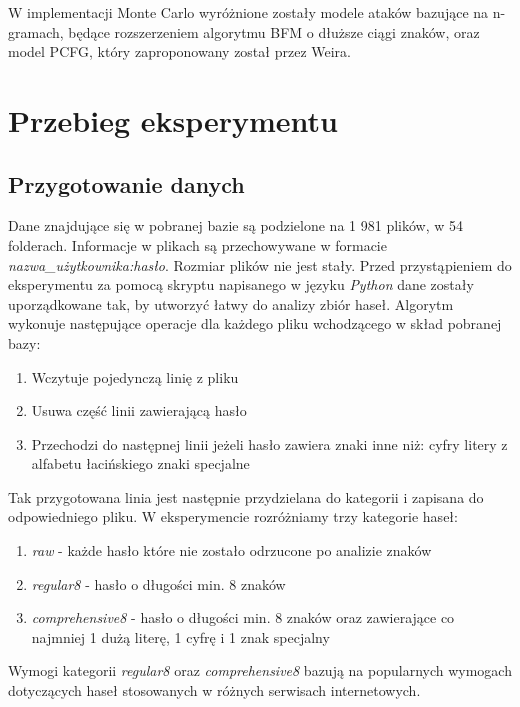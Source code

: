 \documentclass{article}
\begin{document}
	W implementacji Monte Carlo \cite{montecarloimplementation} wyróżnione zostały modele ataków bazujące na n-gramach, będące rozszerzeniem algorytmu BFM o dłuższe ciągi znaków, oraz model PCFG, który zaproponowany został przez Weira.

	\newpage
	\section{Przebieg eksperymentu}
	\subsection{Przygotowanie danych}
	Dane znajdujące się w pobranej bazie są podzielone na 1 981 plików, w 54 folderach. Informacje w plikach są przechowywane w formacie \textit{nazwa\_użytkownika:hasło}. Rozmiar plików nie jest stały. Przed przystąpieniem do eksperymentu za pomocą skryptu napisanego w języku \textit{Python} dane zostały uporządkowane tak, by utworzyć łatwy do analizy zbiór haseł. Algorytm wykonuje następujące operacje dla każdego pliku wchodzącego w skład pobranej bazy:
	\begin{enumerate}
		\item Wczytuje pojedynczą linię z pliku
		\item Usuwa część linii zawierającą hasło
		\item Przechodzi do następnej linii jeżeli hasło zawiera znaki inne niż:
			\subitem cyfry
			\subitem litery z alfabetu łacińskiego
			\subitem znaki specjalne	
	\end{enumerate}	
	Tak przygotowana linia jest następnie przydzielana do kategorii i zapisana do odpowiedniego pliku. W eksperymencie rozróżniamy trzy kategorie haseł:
	\begin{enumerate}
		\item \textit{raw} - każde hasło które nie zostało odrzucone po analizie znaków
		\item \textit{regular8} - hasło o długości min. 8 znaków
		\item \textit{comprehensive8} - hasło o długości min. 8 znaków oraz zawierające co najmniej 1 dużą literę, 1 cyfrę i 1 znak specjalny
	\end{enumerate}
	Wymogi kategorii \textit{regular8} oraz \textit{comprehensive8} bazują na popularnych wymogach dotyczących haseł stosowanych w różnych serwisach internetowych. 
	
\end{document}
